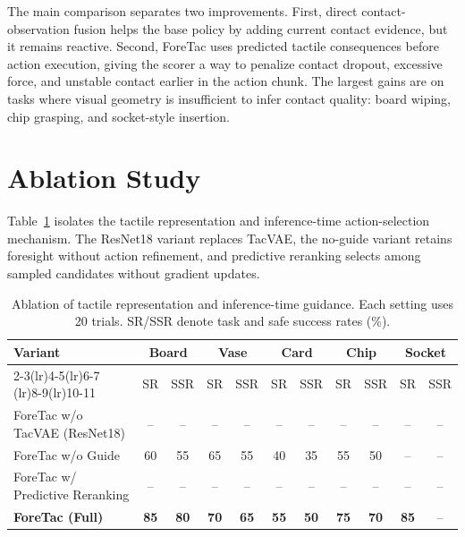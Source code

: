 \documentclass[10pt,letterpaper]{article}
\newcommand{\method}{ForeTac}
\newcommand{\tabstyle}{\small\setlength{\tabcolsep}{3pt}\renewcommand{\arraystretch}{1.15}}
\begin{document}
The main comparison separates two improvements. First, direct contact-observation
fusion helps the base policy by adding current contact evidence, but it remains
reactive. Second, \method{} uses predicted tactile consequences before action
execution, giving the scorer a way to penalize contact dropout, excessive
force, and unstable contact earlier in the action chunk. The largest gains are
on tasks where visual geometry is insufficient to infer contact quality: board
wiping, chip grasping, and socket-style insertion.

\section{Ablation Study}
\label{sec:ablation}

Table~\ref{tab:ablation} isolates the tactile representation and inference-time
action-selection mechanism. The ResNet18 variant replaces TacVAE, the
no-guide variant retains foresight without action refinement, and predictive
reranking selects among sampled candidates without gradient updates.

\begin{table}[H]
\caption{Ablation of tactile representation and inference-time guidance. Each
setting uses 20 trials. SR/SSR denote task and safe success rates (\%).}
\label{tab:ablation}
\centering
\tabstyle
\setlength{\tabcolsep}{2.6pt}
\begin{tabular}{lcccccccccc}
\toprule
\multirow{2}{*}{Variant} & \multicolumn{2}{c}{Board} &
\multicolumn{2}{c}{Vase} & \multicolumn{2}{c}{Card} &
\multicolumn{2}{c}{Chip} & \multicolumn{2}{c}{Socket}\\
\cmidrule(lr){2-3}\cmidrule(lr){4-5}\cmidrule(lr){6-7}
\cmidrule(lr){8-9}\cmidrule(lr){10-11}
& SR & SSR & SR & SSR & SR & SSR & SR & SSR & SR & SSR\\
\midrule
ForeTac w/o TacVAE (ResNet18) & -- & -- & -- & -- & -- & -- & -- & -- & -- & --\\
ForeTac w/o Guide & 60 & 55 & 65 & 55 & 40 & 35 & 55 & 50 & -- & --\\
ForeTac w/ Predictive Reranking & -- & -- & -- & -- & -- & -- & -- & -- & -- & --\\
\textbf{ForeTac (Full)} & \textbf{85} & \textbf{80} & \textbf{70} &
\textbf{65} & \textbf{55} & \textbf{50} & \textbf{75} &
\textbf{70} & \textbf{85} & --\\
\bottomrule
\end{tabular}
\end{table}
\end{document}
